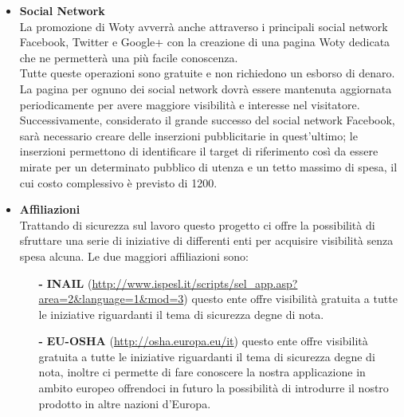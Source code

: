 \begin{itemize}
\item \textbf{Social Network}\\
La promozione di Woty avverrà anche attraverso i principali social network Facebook, Twitter e Google+ con la creazione di una pagina Woty dedicata che ne permetterà una più facile conoscenza.\\
Tutte queste operazioni sono gratuite e non richiedono un esborso di denaro.\\
La pagina per ognuno dei social network dovrà essere mantenuta aggiornata periodicamente per avere maggiore visibilità e interesse nel visitatore.\\
Successivamente, considerato il grande successo del social network Facebook, sarà necessario creare delle inserzioni pubblicitarie in quest'ultimo; le inserzioni permettono di identificare il target di riferimento così da essere mirate per un determinato pubblico di utenza e un tetto massimo di spesa, il cui costo complessivo è previsto di 1200\EUR.

\item \textbf{Affiliazioni}\\
Trattando di sicurezza sul lavoro questo progetto ci offre la possibilità di sfruttare una serie di iniziative di
differenti enti per acquisire visibilità senza spesa alcuna.
Le due maggiori affiliazioni sono:

\begin{itemize}
	\item[\textbf{-}] \textbf{INAIL} (\url{http://www.ispesl.it/scripts/sel_app.asp?area=2&language=1&mod=3}) questo ente offre visibilità gratuita a tutte le iniziative riguardanti il tema di sicurezza degne di nota.

	\item[\textbf{-}] \textbf{EU-OSHA} (\url{http://osha.europa.eu/it}) questo ente offre visibilità gratuita a tutte le iniziative riguardanti il tema di sicurezza degne di nota, inoltre ci permette di fare conoscere la nostra applicazione in ambito europeo offrendoci in futuro la possibilità di introdurre il nostro prodotto in altre nazioni d'Europa.

\end{itemize}


\end{itemize}
